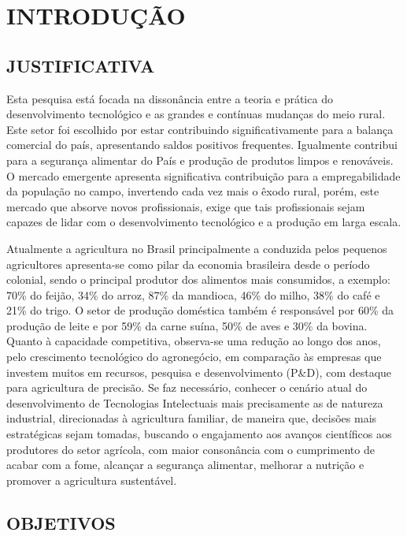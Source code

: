 \chapter{INTRODUÇÃO}



\section{JUSTIFICATIVA}

Esta pesquisa está focada na dissonância entre a teoria e prática do desenvolvimento tecnológico e as grandes e contínuas mudanças do meio rural. Este setor foi escolhido por estar contribuindo significativamente para a balança comercial do país, apresentando saldos positivos frequentes. Igualmente contribui para a segurança alimentar do País e produção de produtos limpos e renováveis. O mercado emergente apresenta significativa contribuição para a empregabilidade da população no campo, invertendo cada vez mais o êxodo rural, porém, este mercado que absorve novos profissionais, exige que tais profissionais sejam capazes de lidar com o desenvolvimento tecnológico e a produção em larga escala. 

Atualmente a agricultura no Brasil principalmente a conduzida pelos pequenos agricultores apresenta-se como pilar da economia brasileira desde o período colonial, sendo o principal produtor dos alimentos mais consumidos, a exemplo: 70\% do feijão, 34\% do arroz, 87\% da mandioca, 46\% do milho, 38\% do café e 21\% do trigo. O setor de produção doméstica também é responsável por 60\% da produção de leite e por 59\% da carne suína, 50\% de aves e 30\% da bovina. Quanto à capacidade competitiva, observa-se uma redução ao longo dos anos, pelo crescimento tecnológico do agronegócio, em comparação às empresas que investem muitos em recursos, pesquisa e desenvolvimento (P&D), com destaque para agricultura de precisão. Se faz necessário, conhecer o cenário atual do desenvolvimento de Tecnologias Intelectuais mais precisamente as de natureza industrial, direcionadas à agricultura familiar, de maneira que, decisões mais estratégicas sejam tomadas, buscando o engajamento aos avanços científicos aos produtores do setor agrícola, com maior consonância com o cumprimento de acabar com a fome, alcançar a segurança alimentar, melhorar a nutrição e promover a agricultura sustentável.

\section{OBJETIVOS}

